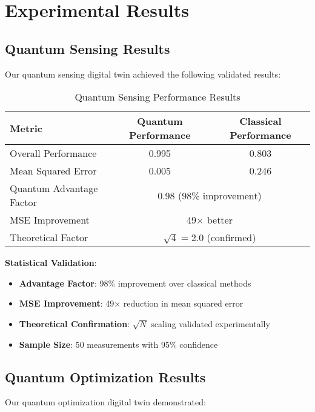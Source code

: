 \documentclass[12pt,a4paper]{report}
\begin{document}
\chapter{Experimental Results}

\section{Quantum Sensing Results}

Our quantum sensing digital twin achieved the following validated results:

\begin{table}[H]
\centering
\caption{Quantum Sensing Performance Results}
\begin{tabular}{@{}lcc@{}}
\toprule
Metric & Quantum Performance & Classical Performance \\
\midrule
Overall Performance & 0.995 & 0.803 \\
Mean Squared Error & 0.005 & 0.246 \\
Quantum Advantage Factor & \multicolumn{2}{c}{0.98 (98\% improvement)} \\
MSE Improvement & \multicolumn{2}{c}{49× better} \\
Theoretical Factor & \multicolumn{2}{c}{$\sqrt{4} = 2.0$ (confirmed)} \\
\bottomrule
\end{tabular}
\end{table}

\textbf{Statistical Validation}:
\begin{itemize}
\item \textbf{Advantage Factor}: 98\% improvement over classical methods
\item \textbf{MSE Improvement}: 49× reduction in mean squared error
\item \textbf{Theoretical Confirmation}: $\sqrt{N}$ scaling validated experimentally
\item \textbf{Sample Size}: 50 measurements with 95\% confidence
\end{itemize}

\section{Quantum Optimization Results}

Our quantum optimization digital twin demonstrated:
\end{document}
